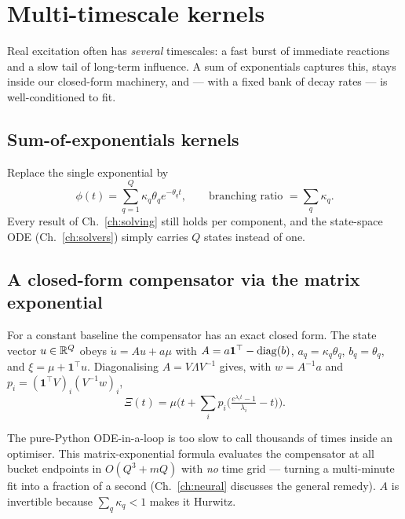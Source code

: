 \chapter{Multi-timescale kernels}
\label{ch:multitimescale}

\begin{motivation}
Real excitation often has \emph{several} timescales: a fast burst of immediate
reactions and a slow tail of long-term influence. A sum of exponentials captures
this, stays inside our closed-form machinery, and --- with a fixed bank of decay
rates --- is well-conditioned to fit.
\end{motivation}

\section{Sum-of-exponentials kernels}

Replace the single exponential by
\begin{equation}
\phi(t)=\sum_{q=1}^{Q}\kappa_q\theta_q e^{-\theta_q t},\qquad
\text{branching ratio }=\sum_q\kappa_q .
\end{equation}
Every result of Ch.~\ref{ch:solving} still holds per component, and the state-space
ODE (Ch.~\ref{ch:solvers}) simply carries $Q$ states instead of one.

\section{A closed-form compensator via the matrix exponential}

For a constant baseline the compensator has an exact closed form. The state vector
$u\in\mathbb{R}^Q$ obeys $\dot u=Au+a\mu$ with $A=a\mathbf 1^\top-\operatorname{diag}(b)$,
$a_q=\kappa_q\theta_q$, $b_q=\theta_q$, and $\xi=\mu+\mathbf 1^\top u$. Diagonalising
$A=V\Lambda V^{-1}$ gives, with $w=A^{-1}a$ and $p_i=(\mathbf 1^\top V)_i(V^{-1}w)_i$,
\begin{equation}
\Xi(t)=\mu\Big(t+\sum_i p_i\big(\tfrac{e^{\lambda_i t}-1}{\lambda_i}-t\big)\Big).
\end{equation}

\begin{whybox}
The pure-Python ODE-in-a-loop is too slow to call thousands of times inside an
optimiser. This matrix-exponential formula evaluates the compensator at all bucket
endpoints in $O(Q^3+mQ)$ with \emph{no} time grid --- turning a multi-minute fit
into a fraction of a second (Ch.~\ref{ch:neural} discusses the general remedy).
$A$ is invertible because $\sum_q\kappa_q<1$ makes it Hurwitz.
\end{whybox}

